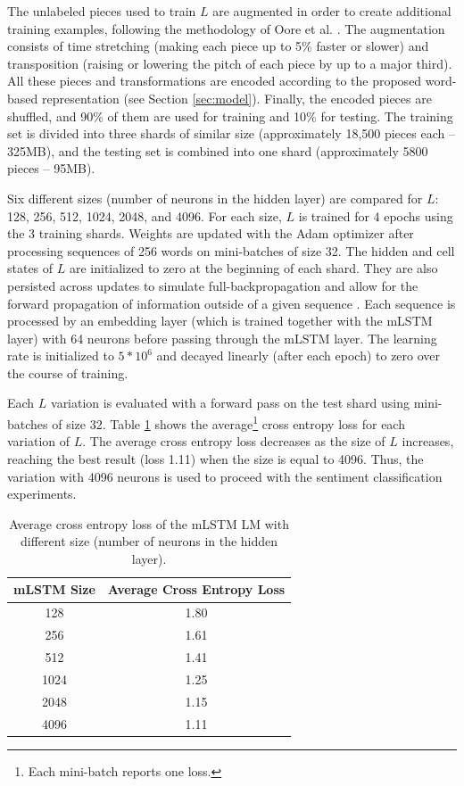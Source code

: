 The unlabeled pieces used to train $L$ are augmented in order to create additional training examples, following the methodology of Oore et al. \cite{oore2017learning}. The augmentation consists of time stretching (making each piece up to 5\% faster or slower) and transposition (raising or lowering the pitch of each piece by up to a major third). All these pieces and transformations are encoded according to the proposed word-based representation (see Section \ref{sec:model}). Finally, the encoded pieces are shuffled, and 90\% of them are used for training and 10\% for testing. The training set is divided into three shards of similar size (approximately 18,500 pieces each -- 325MB), and the testing set is combined into one shard (approximately 5800 pieces -- 95MB).

Six different sizes (number of neurons in the hidden layer) are compared for $L$: 128, 256, 512, 1024, 2048, and 4096. For each size, $L$ is trained for 4 epochs using the 3 training shards. Weights are updated with the Adam optimizer after processing sequences of 256 words on mini-batches of size 32. The hidden and cell states of $L$ are initialized to zero at the beginning of each shard. They are also persisted across updates to simulate full-backpropagation and allow for the forward propagation of information outside of a given sequence \cite{radford_2017}. Each sequence is processed by an embedding layer (which is trained together with the mLSTM layer) with 64 neurons before passing through the mLSTM layer. The learning rate is initialized to $5*10^6$ and decayed linearly (after each epoch) to zero over the course of training.

Each $L$ variation is evaluated with a forward pass on the test shard using mini-batches of size 32. Table \ref{tab:gen_anal} shows the average\footnote{Each mini-batch reports one loss.} cross entropy loss for each variation of $L$. The average cross entropy loss decreases as the size of $L$ increases, reaching the best result (loss 1.11) when the size is equal to 4096. Thus, the variation with 4096 neurons is used to proceed with the sentiment classification experiments.

\begin{table}[!h]
 \begin{center}
 \begin{tabular}{cc}
  \hline
  \textbf{mLSTM Size} & \textbf{Average Cross Entropy Loss}\\ \hline
  128 & 1.80   \\
  256  & 1.61  \\
  512  & 1.41  \\
  1024 & 1.25  \\
  2048 & 1.15  \\
  4096 & 1.11  \\ \hline
 \end{tabular}
\end{center}
\caption{Average cross entropy loss of the mLSTM LM with different size (number of neurons in the hidden layer).}
 \label{tab:gen_anal}
\end{table}

